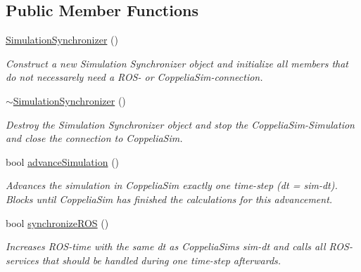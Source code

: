 \subsection*{Public Member Functions}
\begin{DoxyCompactItemize}
\item 
\mbox{\label{classcoppeliasim__interface_1_1SimulationSynchronizer_ac18bb936436db0207cb883539542667b}} 
\hyperlink{classcoppeliasim__interface_1_1SimulationSynchronizer_ac18bb936436db0207cb883539542667b}{Simulation\+Synchronizer} ()
\begin{DoxyCompactList}\small\item\em Construct a new Simulation Synchronizer object and initialize all members that do not necessarely need a R\+O\+S-\/ or Coppelia\+Sim-\/connection. \end{DoxyCompactList}\item 
\mbox{\label{classcoppeliasim__interface_1_1SimulationSynchronizer_afc14256edba11b6ef38de06292476f10}} 
\hyperlink{classcoppeliasim__interface_1_1SimulationSynchronizer_afc14256edba11b6ef38de06292476f10}{$\sim$\+Simulation\+Synchronizer} ()
\begin{DoxyCompactList}\small\item\em Destroy the Simulation Synchronizer object and stop the Coppelia\+Sim-\/\+Simulation and close the connection to Coppelia\+Sim. \end{DoxyCompactList}\item 
bool \hyperlink{classcoppeliasim__interface_1_1SimulationSynchronizer_a511f8bf3569c7dce3dafb2a6f30dd6f2}{advance\+Simulation} ()
\begin{DoxyCompactList}\small\item\em Advances the simulation in Coppelia\+Sim exactly one time-\/step (dt = \textquotesingle{}sim-\/dt\textquotesingle{}). Blocks until Coppelia\+Sim has finished the calculations for this advancement. \end{DoxyCompactList}\item 
bool \hyperlink{classcoppeliasim__interface_1_1SimulationSynchronizer_a14e5777b6eacdd0a2d95603bad137ea0}{synchronize\+R\+OS} ()
\begin{DoxyCompactList}\small\item\em Increases R\+O\+S-\/time with the same dt as Coppelia\+Sim\textquotesingle{}s \textquotesingle{}sim-\/dt\textquotesingle{} and calls all R\+O\+S-\/services that should be handled during one time-\/step afterwards. \end{DoxyCompactList}\item 

\end{DoxyCompactItemize}
